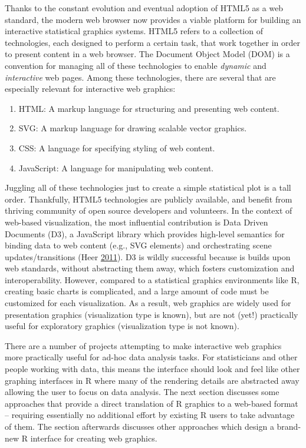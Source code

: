 \documentclass[12pt,]{isuthesis}
\providecommand{\tightlist}{%
  \setlength{\itemsep}{0pt}\setlength{\parskip}{0pt}}
\begin{document}
Thanks to the constant evolution and eventual adoption of HTML5 as a web
standard, the modern web browser now provides a viable platform for
building an interactive statistical graphics systems. HTML5 refers to a
collection of technologies, each designed to perform a certain task,
that work together in order to present content in a web browser. The
Document Object Model (DOM) is a convention for managing all of these
technologies to enable \emph{dynamic} and \emph{interactive} web pages.
Among these technologies, there are several that are especially relevant
for interactive web graphics:

\begin{enumerate}
\def\labelenumi{\arabic{enumi}.}
\tightlist
\item
  HTML: A markup language for structuring and presenting web content.
\item
  SVG: A markup language for drawing scalable vector graphics.
\item
  CSS: A language for specifying styling of web content.
\item
  JavaScript: A language for manipulating web content.
\end{enumerate}

Juggling all of these technologies just to create a simple statistical
plot is a tall order. Thankfully, HTML5 technologies are publicly
available, and benefit from thriving community of open source developers
and volunteers. In the context of web-based visualization, the most
influential contribution is Data Driven Documents (D3), a JavaScript
library which provides high-level semantics for binding data to web
content (e.g., SVG elements) and orchestrating scene updates/transitions
(Heer \protect\hyperlink{ref-Bostock:2011}{2011}). D3 is wildly
successful because is builds upon web standards, without abstracting
them away, which fosters customization and interoperability. However,
compared to a statistical graphics environments like R, creating basic
charts is complicated, and a large amount of code must be customized for
each visualization. As a result, web graphics are widely used for
presentation graphics (visualization type is known), but are not (yet!)
practically useful for exploratory graphics (visualization type is not
known).

There are a number of projects attempting to make interactive web
graphics more practically useful for ad-hoc data analysis tasks. For
statisticians and other people working with data, this means the
interface should look and feel like other graphing interfaces in R where
many of the rendering details are abstracted away allowing the user to
focus on data analysis. The next section discusses some approaches that
provide a direct translation of R graphics to a web-based format --
requiring essentially no additional effort by existing R users to take
advantage of them. The section afterwards discusses other approaches
which design a brand-new R interface for creating web graphics.
\end{document}
